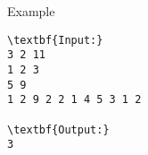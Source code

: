 Example
\begin{verbatim}
\textbf{Input:}
3 2 11
1 2 3
5 9
1 2 9 2 2 1 4 5 3 1 2

\textbf{Output:}
3\end{verbatim}